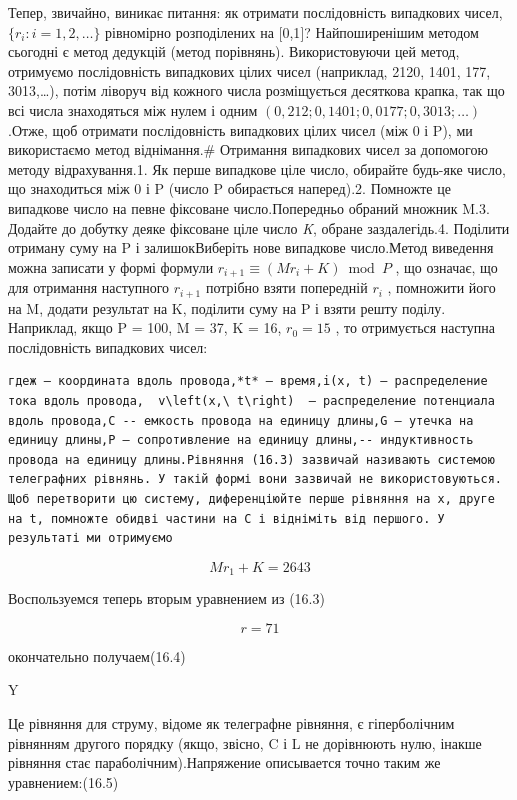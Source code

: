 \documentclass[
  ukrainian,
]{article}
\begin{document}
Тепер, звичайно, виникає питання: як отримати послідовність випадкових
чисел, \(\{r_i: i=1,2,\ldots\}\) рівномірно розподілених на {[}0,1{]}?
Найпоширенішим методом сьогодні є метод дедукцій (метод порівнянь).
Використовуючи цей метод, отримуємо послідовність випадкових цілих чисел
(наприклад, 2120, 1401, 177, 3013,\ldots), потім ліворуч від кожного
числа розміщується десяткова крапка, так що всі числа знаходяться між
нулем і одним \((0,212; 0,1401; 0,0177; 0,3013; \ldots)\) .Отже, щоб
отримати послідовність випадкових цілих чисел (між 0 і P), ми
використаємо метод віднімання.\# Отримання випадкових чисел за допомогою
методу відрахування.1. Як перше випадкове ціле число, обирайте будь-яке
число, що знаходиться між 0 і P (число P обирається наперед).2. Помножте
це випадкове число на певне фіксоване число.Попередньо обраний множник
M.3. Додайте до добутку деяке фіксоване ціле число \emph{K}, обране
заздалегідь.4. Поділити отриману суму на P і залишокВиберіть нове
випадкове число.Метод виведення можна записати у формі формули
\(r_{i+1} \equiv (Mr_i + K) \bmod P\) , що означає, що для отримання
наступного \(r_{i+1}\) потрібно взяти попередній \(r_i\) , помножити
його на M, додати результат на K, поділити суму на P і взяти решту
поділу. Наприклад, якщо P = 100, M = 37, K = 16, \(r_0 = 15\) , то
отримується наступна послідовність випадкових чисел:

\begin{verbatim}
гдеж — координата вдоль провода,*t* — время,i(x, t) — распределение тока вдоль провода,  v\left(x,\ t\right)  — распределение потенциала вдоль провода,С -- емкость провода на единицу длины,G — утечка на единицу длины,Р — сопротивление на единицу длины,-- индуктивность провода на единицу длины.Рівняння (16.3) зазвичай називають системою телеграфних рівнянь. У такій формі вони зазвичай не використовуються. Щоб перетворити цю систему, диференціюйте перше рівняння на x, друге на t, помножте обидві частини на C і відніміть від першого. У результаті ми отримуємо
\end{verbatim}

\[
Mr_1 + K = 2643
\]

Воспользуемся теперь вторым уравнением из (16.3)

\[
r = 71
\]

окончательно получаем(16.4)

Y

Це рівняння для струму, відоме як телеграфне рівняння, є гіперболічним
рівнянням другого порядку (якщо, звісно, C і L не дорівнюють нулю,
інакше рівняння стає параболічним).Напряжение описывается точно таким же
уравнением:(16.5)
\end{document}
